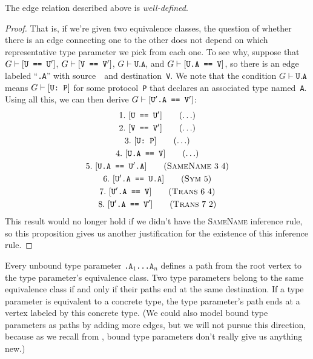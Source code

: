 \documentclass[../generics]{subfiles}
\begin{document}
\begin{proposition}
The edge relation described above is \emph{well-defined}.
\end{proposition}
\begin{proof}
That is, if we're given two equivalence classes, the question of whether there is an edge connecting one to the other does not depend on which representative type parameter we pick from each one.
To see why, suppose that $G\vdash[\texttt{U == $\texttt{U}^\prime$}]$, $G\vdash[\texttt{V == $\texttt{V}^\prime$}]$, $G\vdash\texttt{U.A}$, and $G\vdash[\texttt{U.A == V}]$, so there is an edge labeled ``\texttt{.A}'' with source~\tU\ and destination~\texttt{V}. We note that the condition $G\vdash\texttt{U.A}$ means $G\vdash[\texttt{U:~P}]$ for some protocol~\texttt{P} that declares an associated type named~\texttt{A}. Using all this, we can then derive $G\vdash[\texttt{$\texttt{U}^\prime$\texttt{.A} == $\texttt{V}^\prime$}]$:
\begin{gather*}
\AnyStep{\SameReq{U}{$\tU^\prime$}}{1}\\
\AnyStep{\SameReq{V}{$\texttt{V}^\prime$}}{2}\\
\AnyStep{\ConfReq{U}{P}}{3}\\
\AnyStep{\SameReq{U.A}{V}}{4}\\
\SameNameStep{3}{4}{U.A}{$\tU^\prime$.A}{5}\\
\SymStep{5}{$\tU^\prime$.A}{U.A}{6}\\
\TransStep{6}{4}{$\tU^\prime$.A}{V}{7}\\
\TransStep{7}{2}{$\tU^\prime$.A}{$\texttt{V}^\prime$}{8}
\end{gather*}
This result would no longer hold if we didn't have the \textsc{SameName} inference rule, so this proposition gives us another justification for the existence of this inference rule.
\end{proof}

Every unbound type parameter \texttt{.$\texttt{A}_1$...$\texttt{A}_n$} defines a path from the root vertex to the type parameter's equivalence class. Two type parameters belong to the same equivalence class if and only if their paths end at the same destination. If a type parameter is equivalent to a concrete type, the type parameter's path ends at a vertex labeled by this concrete type. (We could also model bound type parameters as paths by adding more edges, but we will not pursue this direction, because as we recall from , bound type parameters don't really give us anything new.)
\end{document}
